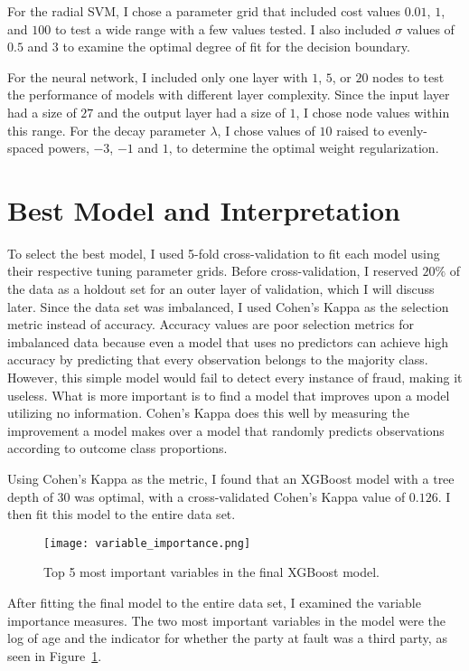 \documentclass{article}
\begin{document}
For the radial SVM, I chose a parameter grid that included cost values $0.01$, $1$, and $100$ to test 
a wide range with a few values tested.  I also included $\sigma$ values of $0.5$ and $3$ to examine 
the optimal degree of fit for the decision boundary.

For the neural network, I included only one layer with $1$, $5$, or $20$ nodes to test the performance 
of models with different layer complexity.  Since the input layer had a size of $27$ and the output 
layer had a size of $1$, I chose node values within this range.  For the decay parameter $\lambda$, 
I chose values of $10$ raised to evenly-spaced powers, $-3$, $-1$ and $1$, to determine the optimal 
weight regularization.

\section{Best Model and Interpretation}

To select the best model, I used 5-fold cross-validation to fit each model using their respective 
tuning parameter grids.  Before cross-validation, I reserved $20\%$ of the data as a holdout set for 
an outer layer of validation, which I will discuss later.  Since the data set was imbalanced, I used 
Cohen's Kappa as the selection metric instead of accuracy.  Accuracy values are poor selection metrics 
for imbalanced data because even a model that uses no predictors can achieve high accuracy by 
predicting that every observation belongs to the majority class. However, this simple model would fail 
to detect every instance of fraud, making it useless.  What is more important is to find a model that 
improves upon a model utilizing no information.  Cohen's Kappa does this well by measuring the 
improvement a model makes over a model that randomly predicts observations according to outcome class 
proportions.   

Using Cohen's Kappa as the metric, I found that an XGBoost model with a tree depth of 30 was optimal, 
with a cross-validated Cohen's Kappa value of $0.126$.  I then fit this model to the entire data set.   

\begin{figure}
    \centering
    \texttt{[image: variable\_importance.png]}
    \caption{Top 5 most important variables in the final XGBoost model.}
    \label{fig:var_imp}
\end{figure}

After fitting the final model to the entire data set, I examined the variable importance measures.  
The two most important variables in the model were the log of age and the indicator for whether the 
party at fault was a third party, as seen in Figure~\ref{fig:var_imp}.   
\end{document}
